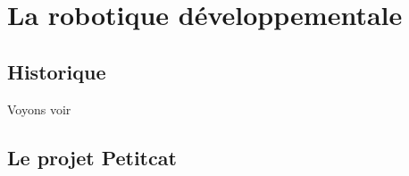 \chapter{La robotique développementale}
\section{Historique}

Voyons voir

\section{Le projet Petitcat}
